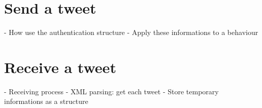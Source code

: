\section{Send a tweet}

- How use the authentication structure
- Apply these informations to a behaviour


\section{Receive a tweet}

- Receiving process
- XML parsing: get each tweet
- Store temporary informations as a structure


\clearpage